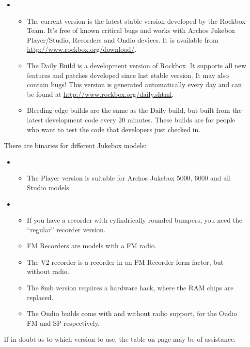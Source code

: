 \begin{itemize}
\item \begin{itemize}
\item The current version is the latest stable version developed by the
Rockbox Team. It's free of known critical bugs and works with Archos
Jukebox Player/Studio, Recorders and Ondio devices.  It is available
from 
\url{http://www.rockbox.org/download/}.
\item The Daily Build is a development version of Rockbox. It supports all new features and patches developed since last stable version. It may also contain bugs! This version is generated automatically every day and can be found at
\url{http://www.rockbox.org/daily.shtml}.
\item Bleeding edge builds are the same as the Daily build, but built
from the latest development code every 20 minutes. These builds are for
people who want to test the code that developers just checked in.
\end{itemize}
\end{itemize}
There are binaries for different Jukebox models: 

\begin{itemize}
\item \begin{itemize}
\item The Player version is suitable for Archos Jukebox 5000, 6000 and
all Studio models.
\end{itemize}
\end{itemize}
\begin{itemize}
\item \begin{itemize}
\item If you have a recorder with cylindrically rounded bumpers, you
need the ``regular'' recorder version. 
\item FM Recorders are models with a FM radio.
\item The V2 recorder is a recorder in an FM Recorder form factor, but
without radio. 
\item The 8mb version requires a hardware hack, where the RAM chips are
replaced. 
\item  The Ondio builds come with and without radio support, for the
Ondio FM and SP respectively.
\end{itemize}
\end{itemize}
If in doubt as to which version to use, the table on page
\pageref{ref:Jukeboxtypetable} may be of assistance.


